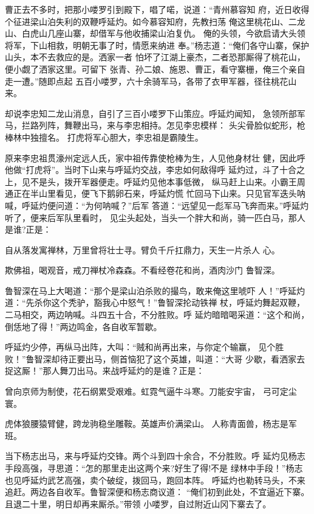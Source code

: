 曹正去不多时，把那小喽罗引到殿下，唱了喏，说道：“青州慕容知
府，近日收得个征进梁山泊失利的双鞭呼延灼。如今慕容知府，先教扫荡
俺这里桃花山、二龙山、白虎山几座山寨，却借军与他收捕梁山泊复仇。
俺的头领，今欲启请大头领将军，下山相救，明朝无事了时，情愿来纳进
奉。”杨志道：“俺们各守山寨，保护山头，本不去救应的是。洒家一者
怕坏了江湖上豪杰，二者恐那厮得了桃花山，便小觑了洒家这里。可留下
张青、孙二娘、施恩、曹正，看守寨栅，俺三个亲自走一遭。”随即点起
五百小喽罗，六十余骑军马，各带了衣甲军器，径往桃花山来。

却说李忠知二龙山消息，自引了三百小喽罗下山策应。呼延灼闻知，
急领所部军马，拦路列阵，舞鞭出马，来与李忠相持。怎见李忠模样：
头尖骨脸似蛇形，枪棒林中独擅名。
打虎将军心胆大，李忠祖是霸陵生。

原来李忠祖贯濠州定远人氏，家中祖传靠使枪棒为生，人见他身材壮
健，因此呼他做“打虎将”。当时下山来与呼延灼交战，李忠如何敌得呼
延灼过，斗了十合之上，见不是头，拨开军器便走。呼延灼见他本事低微，
纵马赶上山来。小霸王周通正在半山里看见，便飞下鹅卵石来，呼延灼慌
忙回马下山来。只见官军迭头呐喊，呼延灼便问道：“为何呐喊？”后军
答道：“远望见一彪军马飞奔而来。”呼延灼听了，便来后军队里看时，
见尘头起处，当头一个胖大和尚，骑一匹白马，那人是谁?正是：

自从落发寓禅林，万里曾将壮士寻。臂负千斤扛鼎力，天生一片杀人
心。

欺佛祖，喝观音，戒刀禅杖冷森森。不看经卷花和尚，酒肉沙门
鲁智深。

鲁智深在马上大喝道：“那个是梁山泊杀败的撮鸟，敢来俺这里唬吓
人！”呼延灼道：“先杀你这个秃驴，豁我心中怒气！”鲁智深抡动铁禅
杖，呼延灼舞起双鞭，二马相交，两边呐喊。斗四五十合，不分胜败。呼
延灼暗暗喝采道：“这个和尚，倒恁地了得！”两边鸣金，各自收军暂歇。

呼延灼少停，再纵马出阵，大叫：“贼和尚再出来，与你定个输赢，
见个胜败！”鲁智深却待正要出马，侧首恼犯了这个英雄，叫道：“大哥
少歇，看洒家去捉这厮！”那人舞刀出马。来战呼延灼的是谁？正是：

曾向京师为制使，花石纲累受艰难。虹霓气逼牛斗寒。刀能安宇宙，
弓可定尘寰。

虎体狼腰猿臂健，跨龙驹稳坐雕鞍。英雄声价满梁山。
人称青面兽，杨志是军班。

当下杨志出马，来与呼延灼交锋。两个斗到四十余合，不分胜败。呼
延灼见杨志手段高强，寻思道：“怎的那里走出这两个来?好生了得!不是
绿林中手段！”杨志也见呼延灼武艺高强，卖个破绽，拨回马，跑回本阵。
呼延灼也勒转马头，不来追赶。两边各自收军。鲁智深便和杨志商议道：
“俺们初到此处，不宜逼近下寨。且退二十里，明日却再来厮杀。”带领
小喽罗，自过附近山冈下寨去了。

